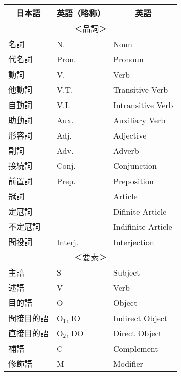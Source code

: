 \begin{table}[h]
  \centering
  \begin{tabular}{lll}
    \hline
    \multicolumn{1}{c}{日本語} & \multicolumn{1}{c}{英語（略称）} & \multicolumn{1}{c}{英語}\\
    \hline \hline
    \multicolumn{3}{c}{＜品詞＞}\\
    名詞 & N. & Noun\\
    代名詞 & Pron. & Pronoun\\
    動詞 & V. & Verb\\
    他動詞 & V.T. & Transitive Verb\\
    自動詞 & V.I. & Intransitive Verb\\
    助動詞 & Aux. & Auxiliary Verb\\
    形容詞 & Adj. & Adjective\\
    副詞 & Adv. & Adverb\\
    接続詞 & Conj. & Conjunction\\
    前置詞 & Prep. & Preposition\\
    冠詞 & & Article\\
    定冠詞 & & Difinite Article\\
    不定冠詞 & & Indifinite Article\\
    間投詞 & Interj. & Interjection\\
    \hline
    \multicolumn{3}{c}{＜要素＞}\\
    主語 & S & Subject\\
    述語 & V & Verb\\
    目的語 & O & Object\\
    間接目的語 & $\text{O}_1$, IO & Indirect Object\\
    直接目的語 & $\text{O}_2$, DO & Direct Object\\
    補語 & C & Complement\\
    修飾語 & M & Modifier\\
    \hline
  \end{tabular}
\end{table}